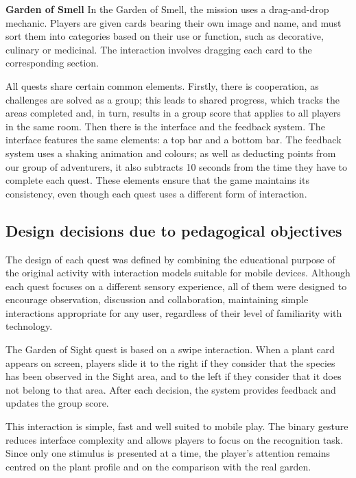 \newpage
\textbf{Garden of Smell}
\newline
In the Garden of Smell, the mission uses a drag-and-drop mechanic. Players are given cards bearing their own image and name, and must sort them into categories based on their use or function, such as decorative, culinary or medicinal. The interaction involves dragging each card to the corresponding section.

All quests share certain common elements. Firstly, there is cooperation, as challenges are solved as a group; this leads to shared progress, which tracks the areas completed and, in turn, results in a group score that applies to all players in the same room. Then there is the interface and the feedback system. The interface features the same elements: a top bar and a bottom bar. The feedback system uses a shaking animation and colours; as well as deducting points from our group of adventurers, it also subtracts 10 seconds from the time they have to complete each quest. These elements ensure that the game maintains its consistency, even though each quest uses a different form of interaction.

\subsection{Design decisions due to pedagogical objectives}

The design of each quest was defined by combining the educational purpose of the original activity with interaction models suitable for mobile devices. Although each quest focuses on a different sensory experience, all of them were designed to encourage observation, discussion and collaboration, maintaining simple interactions appropriate for any user, regardless of their level of familiarity with technology.

The Garden of Sight quest is based on a swipe interaction. When a plant card appears on screen, players slide it to the right if they consider that the species has been observed in the Sight area, and to the left if they consider that it does not belong to that area. After each decision, the system provides feedback and updates the group score.

This interaction is simple, fast and well suited to mobile play. The binary gesture reduces interface complexity and allows players to focus on the recognition task. Since only one stimulus is presented at a time, the player’s attention remains centred on the plant profile and on the comparison with the real garden.

